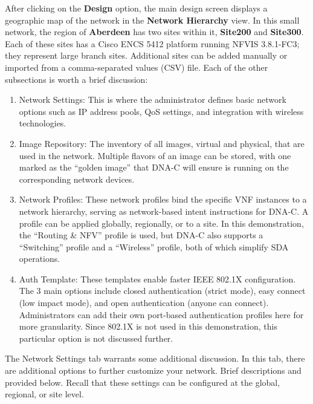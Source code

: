 After clicking on the \textbf{Design} option, the main design screen displays
a geographic map of the network in the \textbf{Network Hierarchy} view. In
this small network, the region of \textbf{Aberdeen} has two sites within it,
\textbf{Site200} and \textbf{Site300}. Each of these sites has a Cisco ENCS
5412 platform running NFVIS 3.8.1-FC3; they represent large branch sites.
Additional sites can be added manually or imported from a comma-separated
values (CSV) file. Each of the other subsections is worth a brief discussion:

\begin{enumerate}
  \item Network Settings: This is where the administrator defines basic
  network options such as IP address pools, QoS settings, and integration with
  wireless technologies.
  \item Image Repository: The inventory of all images, virtual and physical,
  that are used in the network. Multiple flavors of an image can be stored, with
  one marked as the ``golden image'' that DNA-C will ensure is running on the
  corresponding network devices.
  \item Network Profiles: These network profiles bind the specific VNF
  instances to a network hierarchy, serving as network-based intent instructions
  for DNA-C. A profile can be applied globally, regionally, or to a site. In
  this demonstration, the ``Routing \& NFV'' profile is used, but DNA-C also
  supports a ``Switching'' profile and a ``Wireless'' profile, both of which
  simplify SDA operations.
  \item Auth Template: These templates enable faster IEEE 802.1X
  configuration. The 3 main options include closed authentication (strict mode),
  easy connect (low impact mode), and open authentication (anyone can connect).
  Administrators can add their own port-based authentication profiles here for
  more granularity. Since 802.1X is not used in this demonstration, this
  particular option is not discussed further.
\end{enumerate}


The Network Settings tab warrants some additional discussion. In this tab,
there are additional options to further customize your network. Brief
descriptions and provided below. Recall that these settings can be configured
at the global, regional, or site level.


